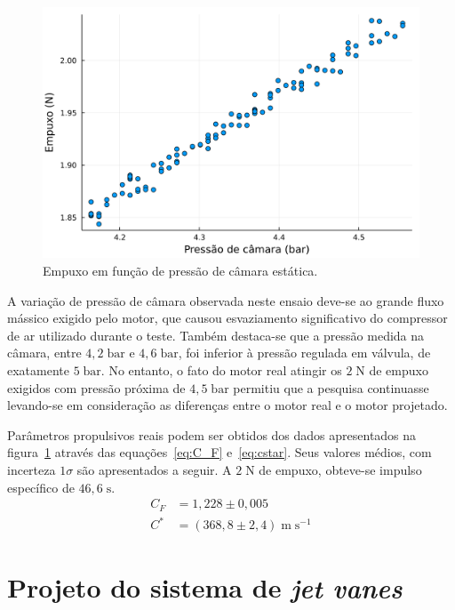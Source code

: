 \begin{figure}[htbp]
    \centering
    \includegraphics[width=\textwidth]{img/thrust_vs_chamber_pressure.png}
    \caption{Empuxo em função de pressão de câmara estática.}\label{fig:thrust_versus_p1}
\end{figure}

A variação de pressão de câmara observada neste ensaio deve-se ao grande fluxo mássico exigido pelo motor, que causou esvaziamento significativo do compressor de ar utilizado durante o teste. Também destaca-se que a pressão medida na câmara, entre \(4,2\;\mathrm{bar}\) e \(4,6\;\mathrm{bar}\), foi inferior à pressão regulada em válvula, de exatamente \(5\;\mathrm{bar}\). No entanto, o fato do motor real atingir os \(2\;\mathrm{N}\) de empuxo exigidos com pressão próxima de \(4,5\;\mathrm{bar}\) permitiu que a pesquisa continuasse levando-se em consideração as diferenças entre o motor real e o motor projetado.

Parâmetros propulsivos reais podem ser obtidos dos dados apresentados na figura~\ref{fig:thrust_versus_p1} através das equações~\ref{eq:C_F} e~\ref{eq:cstar}. Seus valores médios, com incerteza \(1\sigma \) são apresentados a seguir. A \(2\;\mathrm{N}\) de empuxo, obteve-se impulso específico de \(46,6\;\mathrm{s}\).
\begin{align}
    C_F &= 1,228 \pm 0,005 \\
    C^* &= (368,8 \pm 2,4)\;\mathrm{m}\;\mathrm{s}^{-1}
\end{align}

\section{Projeto do sistema de \textit{jet vanes}}\label{sec:result_jet_vanes}

